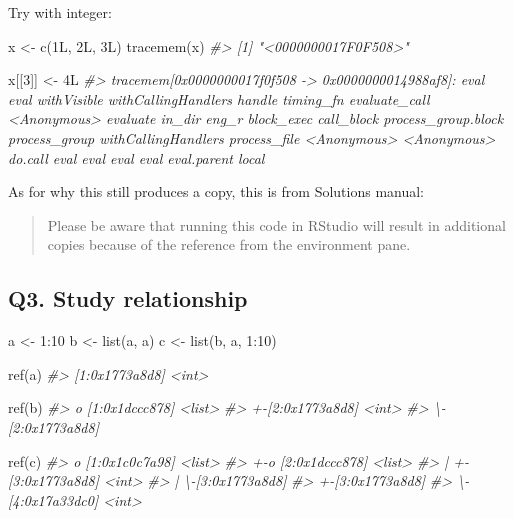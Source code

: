 \documentclass[
]{book}
\newenvironment{Shaded}{\begin{snugshade}}{\end{snugshade}}
\newcommand{\CommentTok}[1]{\textcolor[rgb]{0.56,0.35,0.01}{\textit{#1}}}
\newcommand{\DecValTok}[1]{\textcolor[rgb]{0.00,0.00,0.81}{#1}}
\newcommand{\FunctionTok}[1]{\textcolor[rgb]{0.00,0.00,0.00}{#1}}
\newcommand{\NormalTok}[1]{#1}
\newcommand{\OtherTok}[1]{\textcolor[rgb]{0.56,0.35,0.01}{#1}}
\newcommand{\SpecialCharTok}[1]{\textcolor[rgb]{0.00,0.00,0.00}{#1}}
\begin{document}
Try with integer:

\begin{Shaded}
\begin{Highlighting}[]
\NormalTok{x }\OtherTok{\textless{}{-}} \FunctionTok{c}\NormalTok{(1L, 2L, 3L)}
\FunctionTok{tracemem}\NormalTok{(x)}
\CommentTok{\#\textgreater{} [1] "\textless{}0000000017F0F508\textgreater{}"}

\NormalTok{x[[}\DecValTok{3}\NormalTok{]] }\OtherTok{\textless{}{-}}\NormalTok{ 4L}
\CommentTok{\#\textgreater{} tracemem[0x0000000017f0f508 {-}\textgreater{} 0x0000000014988af8]: eval eval withVisible withCallingHandlers handle timing\_fn evaluate\_call \textless{}Anonymous\textgreater{} evaluate in\_dir eng\_r block\_exec call\_block process\_group.block process\_group withCallingHandlers process\_file \textless{}Anonymous\textgreater{} \textless{}Anonymous\textgreater{} do.call eval eval eval eval eval.parent local}
\end{Highlighting}
\end{Shaded}

As for why this still produces a copy, this is from Solutions manual:

\begin{quote}
Please be aware that running this code in RStudio will result in additional copies because of the reference from the environment pane.
\end{quote}

\hypertarget{q3.-study-relationship}{%
\subsection*{Q3. Study relationship}\label{q3.-study-relationship}}

\begin{Shaded}
\begin{Highlighting}[]
\NormalTok{a }\OtherTok{\textless{}{-}} \DecValTok{1}\SpecialCharTok{:}\DecValTok{10}
\NormalTok{b }\OtherTok{\textless{}{-}} \FunctionTok{list}\NormalTok{(a, a)}
\NormalTok{c }\OtherTok{\textless{}{-}} \FunctionTok{list}\NormalTok{(b, a, }\DecValTok{1}\SpecialCharTok{:}\DecValTok{10}\NormalTok{)}

\FunctionTok{ref}\NormalTok{(a)}
\CommentTok{\#\textgreater{} [1:0x1773a8d8] \textless{}int\textgreater{}}

\FunctionTok{ref}\NormalTok{(b)}
\CommentTok{\#\textgreater{} o [1:0x1dccc878] \textless{}list\textgreater{} }
\CommentTok{\#\textgreater{} +{-}[2:0x1773a8d8] \textless{}int\textgreater{} }
\CommentTok{\#\textgreater{} \textbackslash{}{-}[2:0x1773a8d8]}

\FunctionTok{ref}\NormalTok{(c)}
\CommentTok{\#\textgreater{} o [1:0x1c0c7a98] \textless{}list\textgreater{} }
\CommentTok{\#\textgreater{} +{-}o [2:0x1dccc878] \textless{}list\textgreater{} }
\CommentTok{\#\textgreater{} | +{-}[3:0x1773a8d8] \textless{}int\textgreater{} }
\CommentTok{\#\textgreater{} | \textbackslash{}{-}[3:0x1773a8d8] }
\CommentTok{\#\textgreater{} +{-}[3:0x1773a8d8] }
\CommentTok{\#\textgreater{} \textbackslash{}{-}[4:0x17a33dc0] \textless{}int\textgreater{}}
\end{Highlighting}
\end{Shaded}
\end{document}

